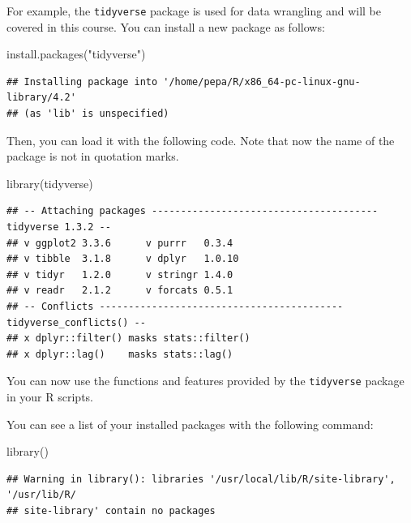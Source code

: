 \documentclass[
]{book}
\newenvironment{Shaded}{\begin{snugshade}}{\end{snugshade}}
\newcommand{\FunctionTok}[1]{\textcolor[rgb]{0.00,0.00,0.00}{#1}}
\newcommand{\NormalTok}[1]{#1}
\newcommand{\StringTok}[1]{\textcolor[rgb]{0.31,0.60,0.02}{#1}}
\begin{document}
For example, the \texttt{tidyverse} package is used for data wrangling and will be covered in this course. You can install a new package as follows:

\begin{Shaded}
\begin{Highlighting}[]
\FunctionTok{install.packages}\NormalTok{(}\StringTok{"tidyverse"}\NormalTok{)}
\end{Highlighting}
\end{Shaded}

\begin{verbatim}
## Installing package into '/home/pepa/R/x86_64-pc-linux-gnu-library/4.2'
## (as 'lib' is unspecified)
\end{verbatim}

Then, you can load it with the following code. Note that now the name of the package is not in quotation marks.

\begin{Shaded}
\begin{Highlighting}[]
\FunctionTok{library}\NormalTok{(tidyverse)}
\end{Highlighting}
\end{Shaded}

\begin{verbatim}
## -- Attaching packages --------------------------------------- tidyverse 1.3.2 --
## v ggplot2 3.3.6      v purrr   0.3.4 
## v tibble  3.1.8      v dplyr   1.0.10
## v tidyr   1.2.0      v stringr 1.4.0 
## v readr   2.1.2      v forcats 0.5.1 
## -- Conflicts ------------------------------------------ tidyverse_conflicts() --
## x dplyr::filter() masks stats::filter()
## x dplyr::lag()    masks stats::lag()
\end{verbatim}

You can now use the functions and features provided by the \texttt{tidyverse} package in your R scripts.

You can see a list of your installed packages with the following command:

\begin{Shaded}
\begin{Highlighting}[]
\FunctionTok{library}\NormalTok{()}
\end{Highlighting}
\end{Shaded}

\begin{verbatim}
## Warning in library(): libraries '/usr/local/lib/R/site-library', '/usr/lib/R/
## site-library' contain no packages
\end{verbatim}
\end{document}
